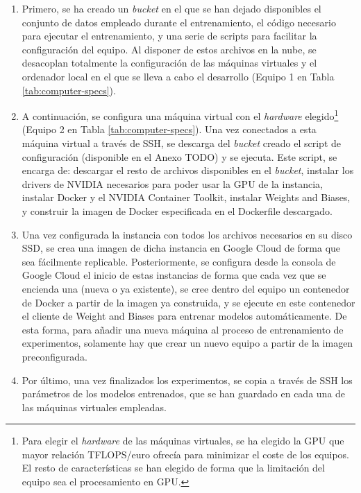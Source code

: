 \begin{enumerate}
\item Primero, se ha creado un \textit{bucket} en el que se han dejado disponibles el conjunto de datos empleado durante el entrenamiento, el código necesario para ejecutar el entrenamiento, y una serie de scripts para facilitar la configuración del equipo. Al disponer de estos archivos en la nube, se desacoplan totalmente la configuración de las máquinas virtuales y el ordenador local en el que se lleva a cabo el desarrollo (Equipo 1 en Tabla \ref{tab:computer-specs}).
\item A continuación, se configura una máquina virtual con el \textit{hardware} elegido\footnote{Para elegir el \textit{hardware} de las máquinas virtuales, se ha elegido la GPU que mayor relación TFLOPS/euro ofrecía para minimizar el coste de los equipos. El resto de características se han elegido de forma que la limitación del equipo sea el procesamiento en GPU.} (Equipo 2 en Tabla \ref{tab:computer-specs}). Una vez conectados a esta máquina virtual a través de SSH, se descarga del \textit{bucket} creado el script de configuración (disponible en el Anexo TODO) y se ejecuta. Este script, se encarga de: descargar el resto de archivos disponibles en el \textit{bucket}, instalar los drivers de NVIDIA necesarios para poder usar la GPU de la instancia, instalar Docker y el NVIDIA Container Toolkit, instalar Weights and Biases, y construir la imagen de Docker especificada en el Dockerfile descargado.
\item Una vez configurada la instancia con todos los archivos necesarios en su disco SSD, se crea una imagen de dicha instancia en Google Cloud de forma que sea fácilmente replicable. Posteriormente, se configura desde la consola de Google Cloud el inicio de estas instancias de forma que cada vez que se encienda una (nueva o ya existente), se cree dentro del equipo un contenedor de Docker a partir de la imagen ya construida, y se ejecute en este contenedor el cliente de Weight and Biases para entrenar modelos automáticamente. De esta forma, para añadir una nueva máquina al proceso de entrenamiento de experimentos, solamente hay que crear un nuevo equipo a partir de la imagen preconfigurada.
\item Por último, una vez finalizados los experimentos, se copia a través de SSH los parámetros de los modelos entrenados, que se han guardado en cada una de las máquinas virtuales empleadas.
\end{enumerate}

